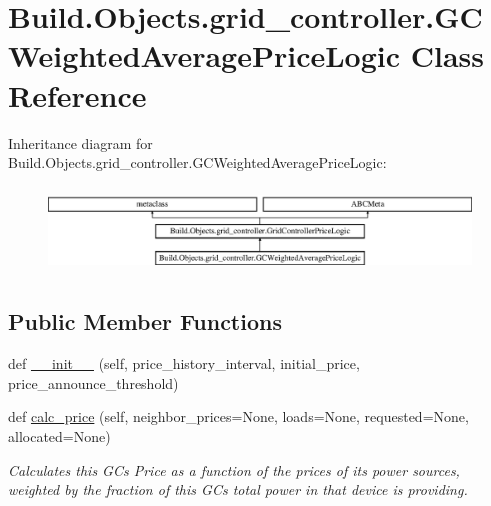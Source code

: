 \hypertarget{class_build_1_1_objects_1_1grid__controller_1_1_g_c_weighted_average_price_logic}{}\section{Build.\+Objects.\+grid\+\_\+controller.\+G\+C\+Weighted\+Average\+Price\+Logic Class Reference}
\label{class_build_1_1_objects_1_1grid__controller_1_1_g_c_weighted_average_price_logic}
Inheritance diagram for Build.\+Objects.\+grid\+\_\+controller.\+G\+C\+Weighted\+Average\+Price\+Logic\+:\begin{figure}[H]
\begin{center}
\leavevmode
\includegraphics[height=2.295082cm]{class_build_1_1_objects_1_1grid__controller_1_1_g_c_weighted_average_price_logic}
\end{center}
\end{figure}
\subsection*{Public Member Functions}
\begin{DoxyCompactItemize}
\item 
def \hyperlink{class_build_1_1_objects_1_1grid__controller_1_1_g_c_weighted_average_price_logic_ad7ea6d4ac784744d0f2a4f0bdf6c5735}{\+\_\+\+\_\+init\+\_\+\+\_\+} (self, price\+\_\+history\+\_\+interval, initial\+\_\+price, price\+\_\+announce\+\_\+threshold)
\item 
def \hyperlink{class_build_1_1_objects_1_1grid__controller_1_1_g_c_weighted_average_price_logic_af7a4032b9379b1d65783cbe7008e5eed}{calc\+\_\+price} (self, neighbor\+\_\+prices=None, loads=None, requested=None, allocated=None)
\begin{DoxyCompactList}\small\item\em Calculates this GC\textquotesingle{}s Price as a function of the prices of its power sources, weighted by the fraction of this GC\textquotesingle{}s total power in that device is providing. \end{DoxyCompactList}\end{DoxyCompactItemize}



